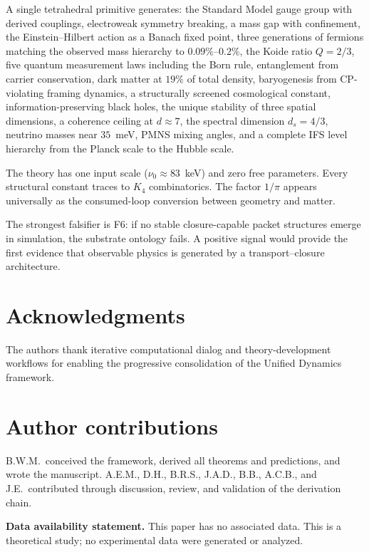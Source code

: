 \documentclass[11pt,twocolumn]{article}
\begin{document}
A single tetrahedral primitive generates: the Standard Model gauge group with derived couplings, electroweak symmetry breaking, a mass gap with confinement, the Einstein--Hilbert action as a Banach fixed point, three generations of fermions matching the observed mass hierarchy to $0.09\%$--$0.2\%$, the Koide ratio $Q=2/3$, five quantum measurement laws including the Born rule, entanglement from carrier conservation, dark matter at $19\%$ of total density, baryogenesis from CP-violating framing dynamics, a structurally screened cosmological constant, information-preserving black holes, the unique stability of three spatial dimensions, a coherence ceiling at $d\approx 7$, the spectral dimension $d_s=4/3$, neutrino masses near $35$~meV, PMNS mixing angles, and a complete IFS level hierarchy from the Planck scale to the Hubble scale.

The theory has one input scale ($\nu_0\approx 83$~keV) and zero free parameters.
Every structural constant traces to $K_4$ combinatorics.
The factor $1/\pi$ appears universally as the consumed-loop conversion between geometry and matter.

The strongest falsifier is F6: if no stable closure-capable packet structures emerge in simulation, the substrate ontology fails.
A positive signal would provide the first evidence that observable physics is generated by a transport--closure architecture.

\section*{Acknowledgments}
The authors thank iterative computational dialog and theory-development workflows for enabling the progressive consolidation of the Unified Dynamics framework.

\section*{Author contributions}
B.W.M.\ conceived the framework, derived all theorems and predictions, and wrote the manuscript.
A.E.M., D.H., B.R.S., J.A.D., B.B., A.C.B., and J.E.\ contributed through discussion, review, and validation of the derivation chain.

\smallskip
\noindent\textbf{Data availability statement.}
This paper has no associated data.
This is a theoretical study; no experimental data were generated or analyzed.
\end{document}
